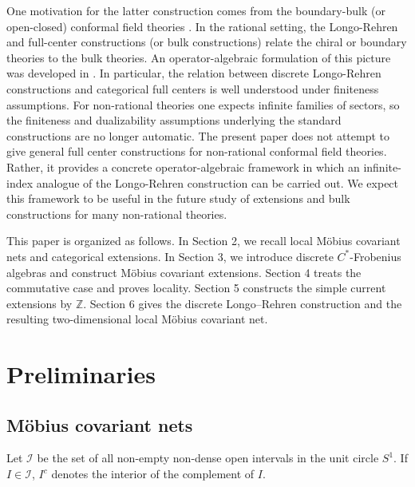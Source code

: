 \documentclass{article}
\newcommand{\Z}{\mathbb{Z}}
\begin{document}
One motivation for the latter construction comes from the boundary-bulk (or open-closed) conformal field theories \cite{cardy1986effect}. In the rational setting, the Longo-Rehren and full-center constructions (or bulk constructions) \cite{Fje+08,kong2008morita} relate the chiral or boundary theories to the bulk theories. An operator-algebraic formulation of this picture was developed in \cite{bischoff2015characterization,bischoff2015tensor}. In particular, the relation between discrete Longo-Rehren constructions and categorical full centers is well understood under finiteness assumptions.
For non-rational theories one expects infinite families of sectors, so the finiteness and dualizability assumptions underlying the standard constructions are no longer automatic. The present paper does not attempt to give general full center constructions for non-rational conformal field theories. Rather, it provides a concrete operator-algebraic framework in which an infinite-index analogue of the Longo-Rehren construction can be carried out.  We expect this framework to be useful in the future study of extensions and bulk constructions for many non-rational theories.

This paper is organized as follows.
In Section 2, we recall local M\"{o}bius covariant nets and categorical extensions. In Section 3, we introduce
discrete $C^*$-Frobenius algebras and construct M\"{o}bius covariant extensions. Section 4 treats the commutative case and proves locality.
Section 5 constructs the simple current extensions by $\Z$. 
Section 6 gives the discrete Longo--Rehren construction and the resulting two-dimensional local Möbius covariant net.




\tableofcontents




\section{Preliminaries}
\subsection{M\"{o}bius covariant nets}
Let $\mathcal{I}$ be the set of all non-empty non-dense open intervals in the unit circle $S^1$. If $I\in\mathcal{I}$, 
$I^c$ denotes the interior of the complement of $I$. 
\end{document}
